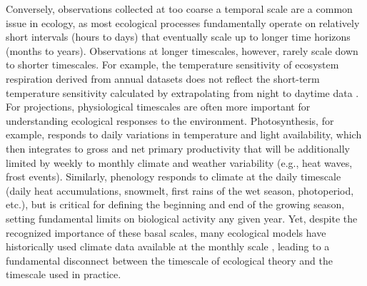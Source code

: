 \documentclass[11pt,a4paper,oneside]{article}
\begin{document}
Conversely, observations collected at too coarse a temporal scale are a common issue in ecology, as most ecological processes fundamentally operate on relatively short intervals (hours to days) that eventually scale up to longer time horizons (months to years). Observations at longer timescales, however, rarely scale down to shorter timescales. For example, the temperature sensitivity of ecosystem respiration derived from annual datasets does not reflect the short-term temperature sensitivity calculated by extrapolating from night to daytime data \citep{Reichstein2005}. For projections, physiological timescales are often more important for understanding ecological responses to the environment. Photosynthesis, for example, responds to daily variations in temperature and light availability, which then integrates to gross and net primary productivity that will be additionally limited by weekly to monthly climate and weather variability (e.g., heat waves, frost events). Similarly, phenology responds to climate at the daily timescale (daily heat accumulations, snowmelt, first rains of the wet season, photoperiod, etc.), but is critical for defining the beginning and end of the growing season, setting fundamental limits on biological activity any given year. Yet, despite the recognized importance of these basal scales, many ecological models have historically used climate data available at the monthly scale \citep{Sitch2003}, leading to a fundamental disconnect between the timescale of ecological theory and the timescale used in practice.
\end{document}
